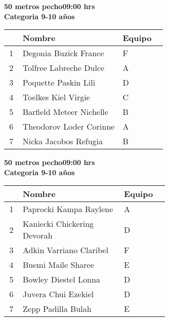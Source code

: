 \begin{minipage}{0.95\linewidth}\vspace{0.5cm} 
\begin{flushleft}
\textbf{
\hspace{-0.15cm}50 metros pecho\hspace{1.5cm}09:00 hrs \\Categoria 9-10 años}\vspace{-0.2cm} 
\end{flushleft}
\begin{tabular}{cp{0.63\linewidth}l}
\hline
& \textbf{Nombre} & \textbf{Equipo} \\ \hline
1 & Degonia Buzick France & F \\ 
2 & Tolfree Labreche Dulce & A \\ 
3 & Poquette Paskin Lili & D \\ 
4 & Toelkes Kiel Virgie & C \\ 
5 & Barfield Meteer Nichelle & B \\ 
6 & Theodorov Loder Corinne & A \\ 
7 & Nicka Jacobos Refugia & B \\ 
\end{tabular}
\end{minipage}
\begin{minipage}{0.95\linewidth}\vspace{0.5cm} 
\begin{flushleft}
\textbf{
\hspace{-0.15cm}50 metros pecho\hspace{1.5cm}09:00 hrs \\Categoria 9-10 años}\vspace{-0.2cm} 
\end{flushleft}
\begin{tabular}{cp{0.63\linewidth}l}
\hline
& \textbf{Nombre} & \textbf{Equipo} \\ \hline
1 & Paprocki Kampa Raylene & A \\ 
2 & Kaniecki Chickering Devorah & D \\ 
3 & Adkin Varriano Claribel & F \\ 
4 & Buemi Maile Sharee & E \\ 
5 & Bowley Diestel Lonna & D \\ 
6 & Juvera Chui Ezekiel & D \\ 
7 & Zepp Padilla Bulah & E \\ 
\end{tabular}
\end{minipage}
